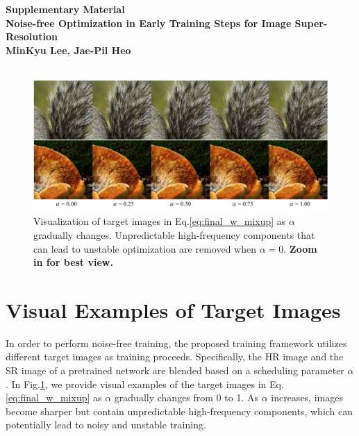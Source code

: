
\appendix
\newpage

\onecolumn
\begin{center}
    \vspace*{0.5cm}
    \LARGE{\bf{Supplementary Material \\ \Large{Noise-free Optimization in Early Training Steps for Image Super-Resolution}}} \\
    \vspace*{0.1cm}
    \bf{\Large{MinKyu Lee, Jae-Pil Heo\footnotemark[1]}} \\
    \vspace*{0.1cm}
    \large{} \\
    \large{}
    \vspace*{1.0cm}
\end{center}




\begin{figure}[h]
    \begin{center}
    \includegraphics[width=\textwidth]{figures/alpha_visualize.pdf}
    \end{center}
    \vspace{-5pt}
    \caption{Visualization of target images in Eq.\eqref{eq:final_w_mixup} as $\alpha$ gradually changes. Unpredictable high-frequency components that can lead to unstable optimization are removed when $\alpha=0$. \textbf{Zoom in for best view.}}
    \label{fig:alpha_visualize}
\end{figure}


\section{Visual Examples of Target Images\hfill\phantom{PLACEHOLDER}}

In order to perform noise-free training, the proposed training framework utilizes different target images as training proceeds. Specifically, the HR image and the SR image of a pretrained network are blended based on a scheduling parameter $\alpha$. In Fig.\ref{fig:alpha_visualize}, we provide visual examples of the target images in Eq.\eqref{eq:final_w_mixup} as $\alpha$ gradually changes from 0 to 1. As $\alpha$ increases, images become sharper but contain unpredictable high-frequency components, which can potentially lead to noisy and unstable training.




